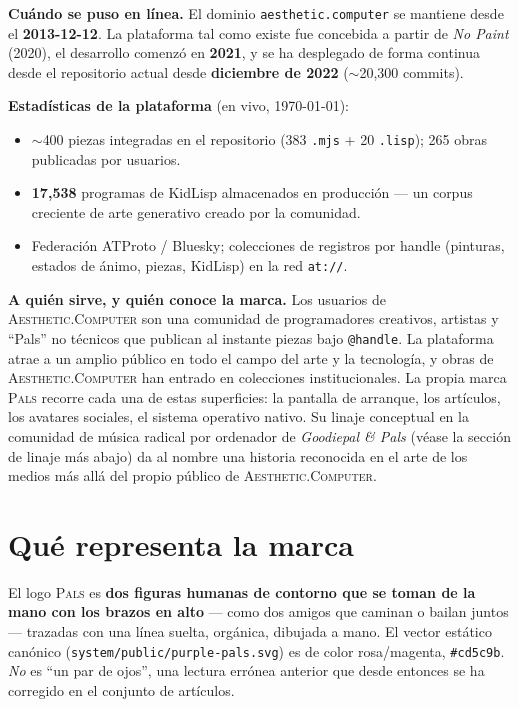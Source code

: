 \documentclass[10pt,letterpaper,twocolumn]{article}
\newcommand{\ac}{\textsc{Aesthetic}{\color{acpink}.}\textsc{Computer}}
\newcommand{\pals}{\textsc{Pals}}
\begin{document}
\textbf{Cuándo se puso en línea.} El dominio \texttt{aesthetic.computer} se
mantiene desde el \textbf{2013-12-12}. La plataforma tal como existe fue
concebida a partir de \emph{No Paint} (2020), el desarrollo comenzó en
\textbf{2021}, y se ha desplegado de forma continua desde el repositorio
actual desde \textbf{diciembre de 2022} ($\sim$20{,}300 commits).

\textbf{Estadísticas de la plataforma} (en vivo, \today):
\begin{itemize}
  \item $\sim$400 piezas integradas en el repositorio (383 \texttt{.mjs} + 20
        \texttt{.lisp}); 265 obras publicadas por usuarios.
  \item \textbf{17{,}538} programas de KidLisp almacenados en producción ---
        un corpus creciente de arte generativo creado por la comunidad.
  \item Federación ATProto / Bluesky; colecciones de registros por handle
        (pinturas, estados de ánimo, piezas, KidLisp) en la red
        \texttt{at://}.
\end{itemize}

\textbf{A quién sirve, y quién conoce la marca.} Los usuarios de \ac{} son una
comunidad de programadores creativos, artistas y ``Pals'' no técnicos que
publican al instante piezas bajo \texttt{@handle}. La plataforma atrae a un
amplio público en todo el campo del arte y la tecnología, y obras de \ac{}
han entrado en colecciones institucionales. La propia marca \pals{} recorre
cada una de estas superficies: la pantalla de arranque, los artículos, los
avatares sociales, el sistema operativo nativo. Su linaje conceptual en la
comunidad de música radical por ordenador de \emph{Goodiepal \& Pals} (véase
la sección de linaje más abajo) da al nombre una historia reconocida en el
arte de los medios más allá del propio público de \ac{}.

\section{Qué representa la marca}

El logo \pals{} es \textbf{dos figuras humanas de contorno que se toman de la
mano con los brazos en alto} --- como dos amigos que caminan o bailan juntos
--- trazadas con una línea suelta, orgánica, dibujada a mano. El vector
estático canónico (\texttt{system/public/purple-pals.svg}) es de color
rosa/magenta, \texttt{\#cd5c9b}. \emph{No} es ``un par de ojos'', una lectura
errónea anterior que desde entonces se ha corregido en el conjunto de
artículos.
\end{document}
